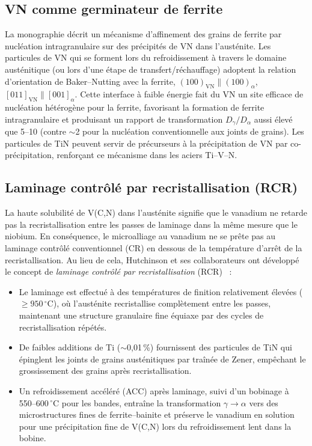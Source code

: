 \documentclass[11pt,a4paper]{article}
\begin{document}
\subsection{VN comme germinateur de ferrite}

La monographie d\'ecrit un m\'ecanisme d'affinement des grains de
ferrite par nucl\'eation intragranulaire sur des pr\'ecipit\'es de VN
dans l'aust\'enite.  Les particules de VN qui se forment lors du
refroidissement \`a travers le domaine aust\'enitique (ou lors d'une
\'etape de transfert/r\'echauffage) adoptent la relation d'orientation
de Baker--Nutting avec la ferrite,
$(100)_\text{VN}\parallel(100)_\alpha$,
$[011]_\text{VN}\parallel[001]_\alpha$.  Cette interface \`a faible
\'energie fait du VN un site efficace de nucl\'eation h\'et\'erog\`ene
pour la ferrite, favorisant la formation de ferrite intragranulaire et
produisant un rapport de transformation $D_\gamma/D_\alpha$ aussi
\'elev\'e que 5--10 (contre $\sim$2 pour la nucl\'eation conventionnelle
aux joints de grains).  Les particules de TiN peuvent servir de
pr\'ecurseurs \`a la pr\'ecipitation de VN par co-pr\'ecipitation,
renfor\c{c}ant ce m\'ecanisme dans les aciers Ti--V--N.

\subsection{Laminage contr\^ol\'e par recristallisation (RCR)}

La haute solubilit\'e de V(C,N) dans l'aust\'enite signifie que le
vanadium ne retarde pas la recristallisation entre les passes de
laminage dans la m\^eme mesure que le niobium.  En cons\'equence, le
microalliage au vanadium ne se pr\^ete pas au laminage contr\^ol\'e
conventionnel (CR) en dessous de la temp\'erature d'arr\^et de la
recristallisation.  Au lieu de cela, Hutchinson et ses collaborateurs ont
d\'evelopp\'e le concept de \emph{laminage contr\^ol\'e par
recristallisation} (RCR) \cite{Zajac1991,Siwecki1995}~:

\begin{itemize}
  \item Le laminage est effectu\'e \`a des temp\'eratures de finition
    relativement \'elev\'ees ($\geq 950\,{}^\circ$C), o\`u l'aust\'enite
    recristallise compl\`etement entre les passes, maintenant une
    structure granulaire fine \'equiaxe par des cycles de
    recristallisation r\'ep\'et\'es.
  \item De faibles additions de Ti ($\sim$0,01\,\%) fournissent des
    particules de TiN qui \'epinglent les joints de grains
    aust\'enitiques par tra\^in\'ee de Zener, emp\^echant le
    grossissement des grains apr\`es recristallisation.
  \item Un refroidissement acc\'el\'er\'e (ACC) apr\`es laminage, suivi
    d'un bobinage \`a 550--$600\,{}^\circ$C pour les bandes, entra\^ine
    la transformation $\gamma\to\alpha$ vers des microstructures fines de
    ferrite--bainite et pr\'eserve le vanadium en solution pour une
    pr\'ecipitation fine de V(C,N) lors du refroidissement lent dans
    la bobine.
\end{itemize}
\end{document}
